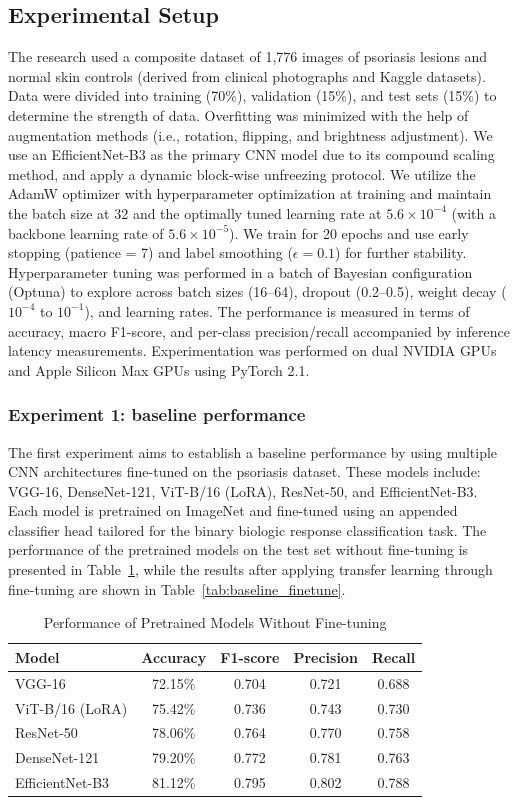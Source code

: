 \documentclass[11pt,journal,compsoc]{IEEEtran}
\begin{document}
\subsection{Experimental Setup}
The research used a composite dataset of 1,776 images of psoriasis lesions and normal skin controls (derived from clinical photographs and Kaggle datasets). Data were divided into training (70\%), validation (15\%), and test sets (15\%) to determine the strength of data. Overfitting was minimized with the help of augmentation methods (i.e., rotation, flipping, and brightness adjustment). We use an EfficientNet-B3 as the primary CNN model due to its compound scaling method, and apply a dynamic block-wise unfreezing protocol. We utilize the AdamW optimizer with hyperparameter optimization at training and maintain the batch size at 32 and the optimally tuned learning rate at $5.6 \times 10^{-4}$ (with a backbone learning rate of $5.6 \times 10^{-5}$). We train for 20 epochs and use early stopping (patience = 7) and label smoothing ($\epsilon = 0.1$) for further stability.
Hyperparameter tuning was performed in a batch of Bayesian configuration (Optuna) to explore across batch sizes (16--64), dropout (0.2--0.5), weight decay ($10^{-4}$ to $10^{-1}$), and learning rates. The performance is measured in terms of accuracy, macro F1-score, and per-class precision/recall accompanied by inference latency measurements. Experimentation was performed on dual NVIDIA GPUs and Apple Silicon Max GPUs using PyTorch 2.1.

\subsubsection{Experiment 1: baseline performance}
The first experiment aims to establish a baseline performance by using multiple CNN architectures fine-tuned on the psoriasis dataset. These models include: VGG-16, DenseNet-121, ViT-B/16 (LoRA), ResNet-50, and EfficientNet-B3. Each model is pretrained on ImageNet and fine-tuned using an appended classifier head tailored for the binary biologic response classification task. The performance of the pretrained models on the test set without fine-tuning is presented in Table~\ref{tab:baseline_no_finetune}, while the results after applying transfer learning through fine-tuning are shown in Table~\ref{tab:baseline_finetune}.

\begin{table}[h]
\centering
\caption{Performance of Pretrained Models Without Fine-tuning}
\label{tab:baseline_no_finetune}
\begin{tabular}{lcccc}
\toprule
Model & Accuracy & F1-score & Precision & Recall \\
\midrule
VGG-16 & 72.15\% & 0.704 & 0.721 & 0.688 \\
ViT-B/16 (LoRA) & 75.42\% & 0.736 & 0.743 & 0.730 \\
ResNet-50 & 78.06\% & 0.764 & 0.770 & 0.758 \\
DenseNet-121 & 79.20\% & 0.772 & 0.781 & 0.763 \\
EfficientNet-B3 & 81.12\% & 0.795 & 0.802 & 0.788 \\
\bottomrule
\end{tabular}
\end{table}
\end{document}
